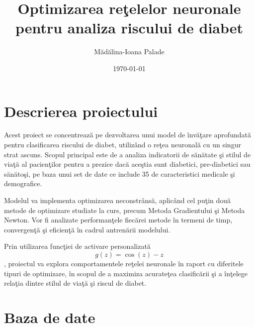 \documentclass{article}
\title{Optimizarea re\c{t}elelor neuronale pentru analiza riscului de diabet}
\author{M\u{a}d\u{a}lina-Ioana Palade}
\date{\today}
\begin{document}
\maketitle

\section{Descrierea proiectului}
Acest proiect se concentreaz\u{a} pe dezvoltarea unui model de \^{i}nv\u{a}\c{t}are aprofundat\u{a} pentru clasificarea riscului de diabet, utiliz\^{a}nd o re\c{t}ea neuronal\u{a} cu un singur strat ascuns. Scopul principal este de a analiza indicatorii de s\u{a}n\u{a}tate \c{s}i stilul de via\c{t}\u{a} al pacien\c{t}ilor pentru a prezice dac\u{a} ace\c{s}tia sunt diabetici, pre-diabetici sau s\u{a}n\u{a}to\c{s}i, pe baza unui set de date ce include 35 de caracteristici medicale \c{s}i demografice.

Modelul va implementa optimizarea neconstr\^{a}ns\u{a}, aplic\^{a}nd cel pu\c{t}in dou\u{a} metode de optimizare studiate la curs, precum Metoda Gradientului \c{s}i Metoda Newton. Vor fi analizate performan\c{t}ele fiec\u{a}rei metode \^{i}n termeni de timp, convergen\c{t}\u{a} \c{s}i eficien\c{t}\u{a} \^{i}n cadrul antren\u{a}rii modelului.

Prin utilizarea func\c{t}iei de activare personalizat\u{a} 
\begin{equation}
g(z) = \cos(z) - z
\end{equation}
, proiectul va explora comportamentele re\c{t}elei neuronale \^{i}n raport cu diferitele tipuri de optimizare, \^{i}n scopul de a maximiza acurate\c{t}ea clasific\u{a}rii \c{s}i a \^{i}n\c{t}elege rela\c{t}ia dintre stilul de via\c{t}\u{a} \c{s}i riscul de diabet.

\section{Baza de date}
\end{document}
